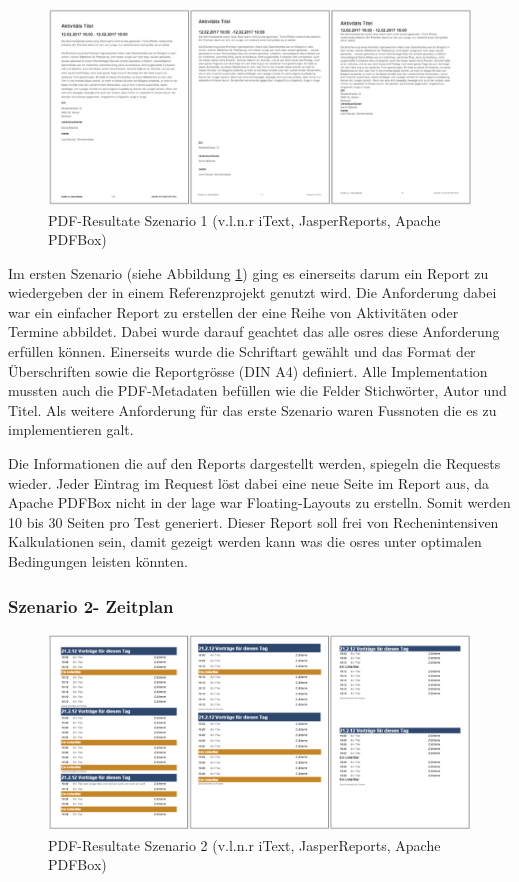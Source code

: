 \documentclass[main.tex]{subfiles}
\begin{document}
\begin{figure}[h]
\includegraphics[width=\textwidth]{mainpart/3_methodik_evaluation_img/Szenario1PDF.PNG}
 \caption{PDF-Resultate Szenario 1 (v.l.n.r iText, JasperReports, Apache PDFBox)}
 \label{figure:PDFResultSzen1}
\end{figure}

Im ersten Szenario (siehe Abbildung \ref{figure:PDFResultSzen1}) ging es einerseits darum ein Report zu wiedergeben der in einem Referenzprojekt genutzt wird. Die Anforderung dabei war ein einfacher Report zu erstellen der eine Reihe von Aktivitäten oder Termine abbildet. Dabei wurde darauf geachtet das alle \acrlong{osre}s diese Anforderung erfüllen können. Einerseits wurde die Schriftart gewählt und das Format der Überschriften sowie die Reportgrösse (DIN A4) definiert. Alle Implementation mussten auch die PDF-Metadaten befüllen wie die Felder Stichwörter, Autor und Titel. Als weitere Anforderung für das erste Szenario waren Fussnoten die es zu implementieren galt. 

Die Informationen die auf den Reports dargestellt werden, spiegeln die Requests wieder. Jeder Eintrag im Request löst dabei eine neue Seite im Report aus, da Apache PDFBox nicht in der lage war Floating-Layouts zu erstelln. Somit werden 10 bis 30 Seiten pro Test generiert. Dieser Report soll frei von Rechenintensiven Kalkulationen sein, damit gezeigt werden kann was die \acrlong{osre}s unter optimalen Bedingungen leisten könnten. 


\subsubsection{Szenario 2- Zeitplan}
\begin{figure}[h]
\includegraphics[width=\textwidth]{mainpart/3_methodik_evaluation_img/Szenario2PDF.PNG}
 \caption{PDF-Resultate Szenario 2 (v.l.n.r iText, JasperReports, Apache PDFBox)}
 \label{figure:PDFResultSzen2}
\end{figure}
\end{document}
